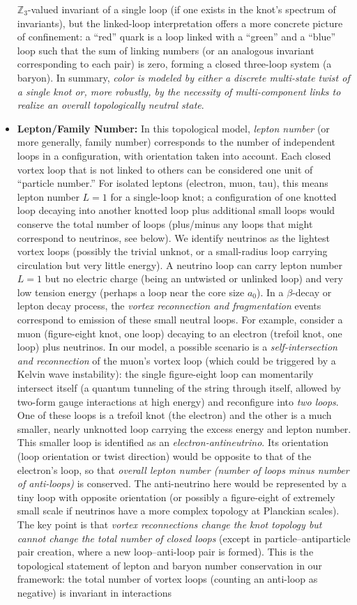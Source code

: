 \documentclass[12pt]{article}
\begin{document}
\begin{itemize}
$\mathbb{Z}_3$-valued invariant of a single loop (if one exists in the knot’s spectrum of invariants), but the linked-loop interpretation offers a more concrete picture of confinement: a “red” quark is a loop linked with a “green” and a “blue” loop such that the sum of linking numbers (or an analogous invariant corresponding to each pair) is zero, forming a closed three-loop system (a baryon). In summary, \emph{color is modeled by either a discrete multi-state twist of a single knot or, more robustly, by the necessity of multi-component links to realize an overall topologically neutral state}.
    \item \textbf{Lepton/Family Number:} In this topological model, \emph{lepton number} (or more generally, family number) corresponds to the number of independent loops in a configuration, with orientation taken into account. Each closed vortex loop that is not linked to others can be considered one unit of “particle number.” For isolated leptons (electron, muon, tau), this means lepton number $L=1$ for a single-loop knot; a configuration of one knotted loop decaying into another knotted loop plus additional small loops would conserve the total number of loops (plus/minus any loops that might correspond to neutrinos, see below). We identify neutrinos as the lightest vortex loops (possibly the trivial unknot, or a small-radius loop carrying circulation but very little energy). A neutrino loop can carry lepton number $L=1$ but no electric charge (being an untwisted or unlinked loop) and very low tension energy (perhaps a loop near the core size $a_0$). In a $\beta$-decay or lepton decay process, the \emph{vortex reconnection and fragmentation} events correspond to emission of these small neutral loops. For example, consider a muon (figure-eight knot, one loop) decaying to an electron (trefoil knot, one loop) plus neutrinos. In our model, a possible scenario is a \emph{self-intersection and reconnection} of the muon’s vortex loop (which could be triggered by a Kelvin wave instability): the single figure-eight loop can momentarily intersect itself (a quantum tunneling of the string through itself, allowed by two-form gauge interactions at high energy) and reconfigure into \emph{two loops}. One of these loops is a trefoil knot (the electron) and the other is a much smaller, nearly unknotted loop carrying the excess energy and lepton number. This smaller loop is identified as an \emph{electron-antineutrino}. Its orientation (loop orientation or twist direction) would be opposite to that of the electron’s loop, so that \emph{overall lepton number (number of loops minus number of anti-loops)} is conserved. The anti-neutrino here would be represented by a tiny loop with opposite orientation (or possibly a figure-eight of extremely small scale if neutrinos have a more complex topology at Planckian scales). The key point is that \emph{vortex reconnections change the knot topology but cannot change the total number of closed loops} (except in particle–antiparticle pair creation, where a new loop–anti-loop pair is formed). This is the topological statement of lepton and baryon number conservation in our framework: the total number of vortex loops (counting an anti-loop as negative) is invariant in interactions 
\end{itemize}
\end{document}
